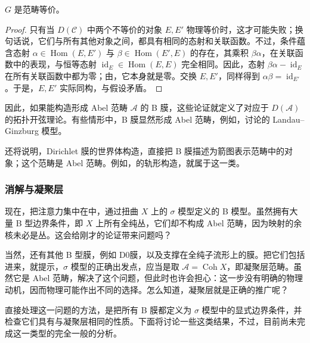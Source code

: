 \begin{proposition}\label{prop:5.16}
$G$ 是范畴等价。
\end{proposition}
\begin{proof}
只有当 $D(\mathcal{C})$ 中两个不等价的对象 $E,E'$ 物理等价时，这才可能失败；换句话说，它们与所有其他对象之间，都具有相同的态射和关联函数。不过，条件蕴含态射 $\alpha\in\operatorname{Hom}(E,E')$ 与 $\beta\in\operatorname{Hom}(E',E)$ 的存在，其乘积 $\beta\alpha$，在关联函数中的表现，与恒等态射 $\operatorname{id}_E\in\operatorname{Hom}(E,E)$ 完全相同。因此，态射 $\beta\alpha-\operatorname{id}_E$ 在所有关联函数中都为零；由，它本身就是零。交换 $E,E'$，同样得到 $\alpha\beta=\operatorname{id}_{E'}$。于是，$E,E'$ 实际同构，与假设矛盾。
\end{proof}

因此，如果能构造形成 Abel 范畴 $\mathcal{A}$ 的 B 膜，这些论证就定义了对应于 $D(\mathcal{A})$ 的拓扑开弦理论。有些情形中，B 膜显然形成 Abel 范畴，例如，讨论的 Landau--Ginzburg 模型。

还将说明，Dirichlet 膜的世界体构造，直接把 B 膜描述为箭图表示范畴中的对象；这个范畴是 Abel 范畴。例如，的轨形构造，就属于这一类。

\subsubsection{消解与凝聚层}\label{sec:5.3.3.3}

现在，把注意力集中在中，通过扭曲 $X$ 上的 $\sigma$ 模型定义的 B 模型。虽然拥有大量 B 型边界条件，即 $X$ 上所有全纯丛，它们却不构成 Abel 范畴，因为映射的余核未必是丛。这会给刚才的论证带来问题吗？

当然，还有其他 B 型膜，例如 D0膜，以及支撑在全纯子流形上的膜。把它们包括进来，就提示，$\sigma$ 模型的正确出发点，应当是取 $\mathcal{A}=\operatorname{Coh}X$，即凝聚层范畴。虽然它是 Abel 范畴，解决了这个问题，但此时也许会担心：这一步没有明确的物理动机，因而物理可能作出不同的选择。怎么知道，凝聚层就是正确的推广呢？

直接处理这一问题的方法，是把所有 B 膜都定义为 $\sigma$ 模型中的显式边界条件，并检查它们具有与凝聚层相同的性质。下面将讨论一些这类结果，不过，目前尚未完成这一类型的完全一般的分析。

